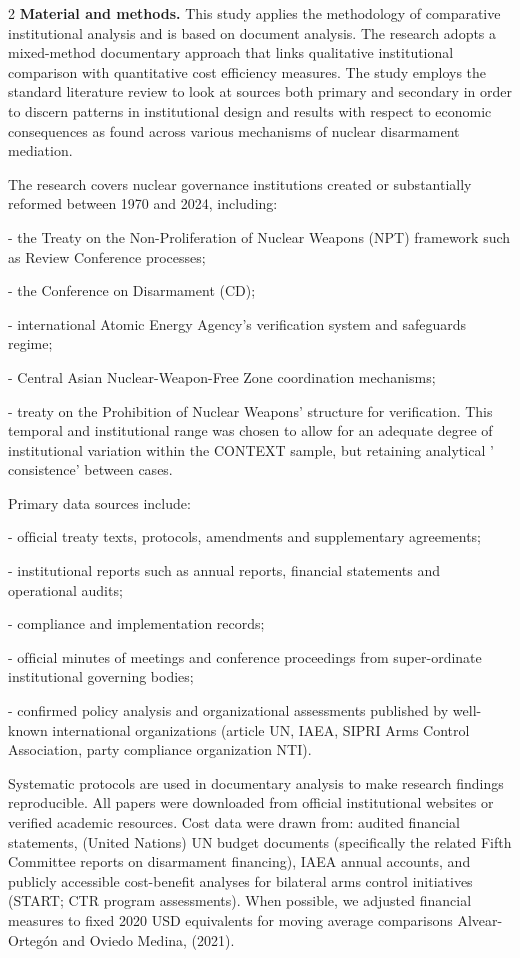 \begin{multicols}{2}
{\bfseries Material and methods.} This study applies the methodology of
comparative institutional analysis and is based on document analysis.
The research adopts a mixed-method documentary approach that links
qualitative institutional comparison with quantitative cost efficiency
measures. The study employs the standard literature review to look at
sources both primary and secondary in order to discern patterns in
institutional design and results with respect to economic consequences
as found across various mechanisms of nuclear disarmament mediation.

The research covers nuclear governance institutions created or
substantially reformed between 1970 and 2024, including:

- the Treaty on the Non-Proliferation of Nuclear Weapons (NPT) framework
such as Review Conference processes;

- the Conference on Disarmament (CD);

- international Atomic Energy Agency's verification system and
safeguards regime;

- Central Asian Nuclear-Weapon-Free Zone coordination mechanisms;

- treaty on the Prohibition of Nuclear Weapons' structure for
verification. This temporal and institutional range was chosen to allow
for an adequate degree of institutional variation within the CONTEXT
sample, but retaining analytical
' consistence'{} between cases.

Primary data sources include:

- ofﬁcial treaty texts, protocols, amendments and supplementary
agreements;

- institutional reports such as annual reports, ﬁnancial statements and
operational audits;

- compliance and implementation records;

- ofﬁcial minutes of meetings and conference proceedings from
super-ordinate institutional governing bodies;

- conﬁrmed policy analysis and organizational assessments published by
well-known international organizations (article UN, IAEA, SIPRI Arms
Control Association, party compliance organization NTI).

Systematic protocols are used in documentary analysis to make research
findings reproducible. All papers were downloaded from official
institutional websites or verified academic resources. Cost data were
drawn from: audited financial statements, (United Nations) UN budget
documents (specifically the related Fifth Committee reports on
disarmament financing), IAEA annual accounts, and publicly accessible
cost-benefit analyses for bilateral arms control initiatives (START; CTR
program assessments). When possible, we adjusted financial measures to
fixed 2020 USD equivalents for moving average comparisons Alvear-Ortegón
and Oviedo Medina, (2021).


\end{multicols}
